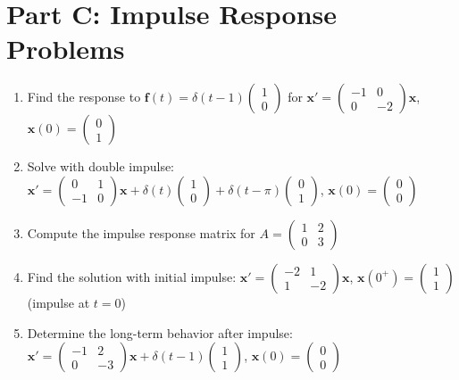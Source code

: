 \documentclass[12pt]{article}
\begin{document}
\section*{Part C: Impulse Response Problems}

\begin{enumerate}[start=11]
\item Find the response to $\mathbf{f}(t) = \delta(t-1)\begin{pmatrix} 1 \\ 0 \end{pmatrix}$ for $\mathbf{x}' = \begin{pmatrix} -1 & 0 \\ 0 & -2 \end{pmatrix}\mathbf{x}$, $\mathbf{x}(0) = \begin{pmatrix} 0 \\ 1 \end{pmatrix}$

\item Solve with double impulse: $\mathbf{x}' = \begin{pmatrix} 0 & 1 \\ -1 & 0 \end{pmatrix}\mathbf{x} + \delta(t)\begin{pmatrix} 1 \\ 0 \end{pmatrix} + \delta(t-\pi)\begin{pmatrix} 0 \\ 1 \end{pmatrix}$, $\mathbf{x}(0) = \begin{pmatrix} 0 \\ 0 \end{pmatrix}$

\item Compute the impulse response matrix for $A = \begin{pmatrix} 1 & 2 \\ 0 & 3 \end{pmatrix}$

\item Find the solution with initial impulse: $\mathbf{x}' = \begin{pmatrix} -2 & 1 \\ 1 & -2 \end{pmatrix}\mathbf{x}$, $\mathbf{x}(0^+) = \begin{pmatrix} 1 \\ 1 \end{pmatrix}$ (impulse at $t=0$)

\item Determine the long-term behavior after impulse: $\mathbf{x}' = \begin{pmatrix} -1 & 2 \\ 0 & -3 \end{pmatrix}\mathbf{x} + \delta(t-1)\begin{pmatrix} 1 \\ 1 \end{pmatrix}$, $\mathbf{x}(0) = \begin{pmatrix} 0 \\ 0 \end{pmatrix}$
\end{enumerate}
\end{document}
